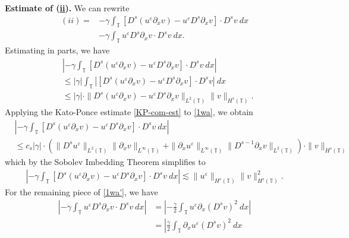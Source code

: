 \documentclass[12pt,reqno]{amsart}
\newcommand{\p}{\partial}
\newcommand{\ci}{\mathbb{T}}
\newcommand{\ee}{\varepsilon}
\theoremstyle{plain}  %
\theoremstyle{definition}
\begin{document}
\begin{appendices}
%
\vskip0.1in
{\bf Estimate of (\hyperref[8u]{ii}).} We can rewrite
	\begin{equation}
		\begin{split}
			(ii)
			= & -\gamma \int_\ci \left[ D^s(u^\ee \p_x v) - u^\ee D^s
			\p_x v \right] \cdot D^s v \ dx
			\\
			& -  \gamma \int_\ci u^\ee D^s \p_x v \cdot D^s v \ dx.
			\label{1wa'}
		\end{split}
	\end{equation}
	Estimating in parts, we have
	\begin{equation}
		\begin{split}
			& |-\gamma \int_\ci \left[ D^s(u^\ee \p_x v) - u^\ee D^s
			\p_x v \right] \cdot D^s v \ dx |
			\\
			& \le |\gamma| \int_\ci |\left[ D^s(u^\ee \p_x v) - u^\ee D^s
			\p_x v \right] \cdot D^s v| \ dx
			\\
			& \le |\gamma| \cdot \|D^s (u^\ee \p_x v) - u^\ee D^s \p_x v
			\|_{L^2(\ci)} \|v\|_{H^s(\ci)}.
			\label{1wa}
		\end{split}
	\end{equation}
	Applying the Kato-Ponce estimate \eqref{KP-com-est} to \eqref{1wa}, we
	obtain
	\begin{equation*}
		\begin{split}
			& | -\gamma \int_\ci \left[ D^s(u^\ee \p_x v) - u^\ee D^s
			\p_x v \right] \cdot D^s v \ dx |
			\\
			& \le c_s |\gamma| \cdot ( \|D^s u^\ee \|_{L^2(\ci)} \|\p_x
			v\|_{L^\infty(\ci)} + \|\p_x u^\ee \|_{L^\infty(\ci)} \|D^{s-1}
			\p_x v \|_{L^2(\ci)}) \cdot \|v\|_{H^s(\ci)}
		\end{split}
	\end{equation*}
	which by the Sobolev Imbedding Theorem simplifies to
	\begin{equation}
		\begin{split}
			| -\gamma \int_\ci \left[ D^s(u^\ee \p_x v) - u^\ee D^s
			\p_x v \right] \cdot D^s v \ dx |
			\lesssim \|u^\ee \|_{H^s(\ci)} \|v\|_{H^s(\ci)}^2.
			\label{2wa}
		\end{split}
	\end{equation}
	For the remaining piece of \eqref{1wa'}, we have
	\begin{equation*}
		\begin{split}
			| - \gamma \int_\ci u^\ee D^s \p_x v \cdot D^s v \ dx |
			& = \left | -\frac{\gamma}{2} \int_\ci u^\ee \p_x (D^s v)^2 \
			dx \right |
			\\
			& = \left | \frac{\gamma}{2} \int_\ci \p_x u^\ee (D^s v)^2 \ dx

\end{split}
\end{equation*}
\end{appendices}
\end{document}
